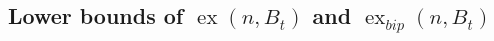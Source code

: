 \documentclass[11pt,a4paper]{article}
\newtheorem{theorem}{Theorem}[section]
\theoremstyle{definition}
\DeclareMathOperator{\ex}{ex}
\begin{document}



        \subsection{Lower bounds of $\ex(n, B_t)$ and $\ex_{bip}(n, B_t)$}\label{subsec: lower bound}

        

\end{document}
